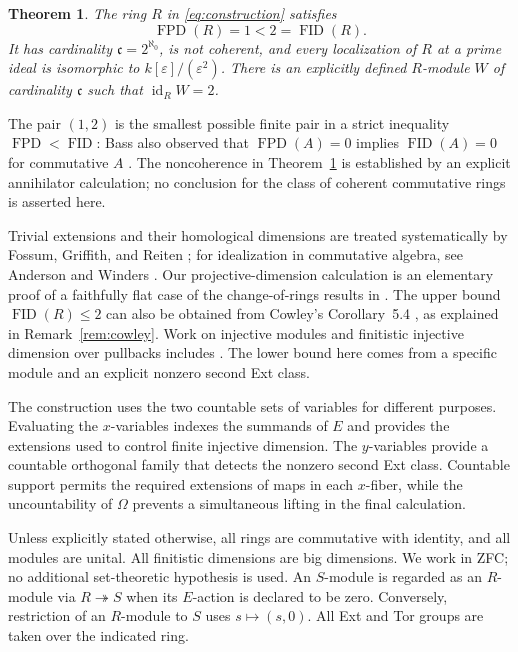 \documentclass[11pt]{amsart}
\newtheorem{theorem}{Theorem}[section]
\theoremstyle{definition}
\DeclareMathOperator{\FPD}{FPD}
\DeclareMathOperator{\FID}{FID}
\DeclareMathOperator{\id}{id}
\newcommand{\cc}{\mathfrak c}
\newcommand{\eps}{\varepsilon}
\newcommand{\onto}{\twoheadrightarrow}
\numberwithin{equation}{section}
\begin{document}
\begin{theorem}\label{thm:main}
The ring $R$ in \eqref{eq:construction} satisfies
\[
 \FPD(R)=1<2=\FID(R).
\]
It has cardinality $\cc=2^{\aleph_0}$, is not coherent, and every
localization of $R$ at a prime ideal is isomorphic to
$k[\eps]/(\eps^2)$. There is an explicitly defined $R$-module $W$ of
cardinality $\cc$ such that $\id_R W=2$.
\end{theorem}

The pair $(1,2)$ is the smallest possible finite pair in a strict
inequality $\FPD<\FID$: Bass also observed that $\FPD(A)=0$ implies
$\FID(A)=0$ for commutative $A$ \cite[p.~487]{Bass1960}.
The noncoherence in Theorem~\ref{thm:main} is established by an explicit
annihilator calculation; no conclusion for the class of coherent
commutative rings is asserted here.

Trivial extensions and their homological dimensions are treated
systematically by Fossum, Griffith, and Reiten \cite{FGR1975}; for
idealization in commutative algebra, see Anderson and Winders
\cite{AndersonWinders2009}. Our projective-dimension calculation is an
elementary proof of a faithfully flat case of the change-of-rings
results in \cite[Section~4.A]{FGR1975}. The upper bound $\FID(R)\leq2$ can also be obtained from Cowley's Corollary~5.4 \cite[p.~370]{Cowley1997},
as explained in Remark~\ref{rem:cowley}. Work on injective modules and finitistic injective
dimension over pullbacks includes \cite{FacchiniVamos1985,Xiong2026}.
The lower bound here comes from a specific module and an explicit
nonzero second Ext class.

The construction uses the two countable sets of variables for different
purposes. Evaluating the $x$-variables indexes the summands of $E$ and
provides the extensions used to control finite injective dimension.
The $y$-variables provide a countable orthogonal family that detects the
nonzero second Ext class. Countable support permits the required
extensions of maps in each $x$-fiber, while the uncountability of
$\Omega$ prevents a simultaneous lifting in the final calculation.

Unless explicitly stated otherwise, all rings are commutative
with identity, and all modules are unital. All finitistic dimensions are big dimensions. We work in
ZFC; no additional set-theoretic hypothesis is used. An $S$-module is
regarded as an $R$-module via $R\onto S$ when its $E$-action is declared
to be zero. Conversely, restriction of an $R$-module to $S$ uses
$s\mapsto(s,0)$. All Ext and Tor groups are taken over the indicated
ring.
\end{document}
